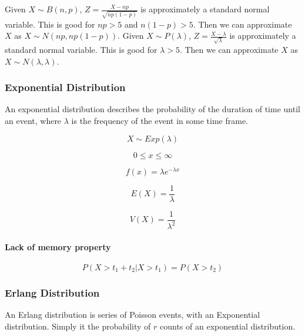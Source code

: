 \documentclass[12pt]{article}
\begin{document}
	Given \(X\sim B(n,p)\), \(Z=\frac{X-np}{\sqrt{np(1-p)}}\) is approximately a standard normal variable. This is good for \(np>5\) and \(n(1-p)>5\). Then we can approximate \(X\) as \(X\sim N(np, np(1-p))\).
	\newline
	\noindent Given \(X\sim P(\lambda)\), \(Z=\frac{X-\lambda}{\sqrt{\lambda}}\) is approximately a standard normal variable. This is good for \(\lambda>5\). Then we can approximate \(X\) as \(X\sim N(\lambda, \lambda)\).
	
	\newpage
	\subsubsection{Exponential Distribution}
	
	An exponential distribution describes the probability of the duration of time until an event, where \(\lambda\) is the frequency of the event in some time frame.
	
		\begin{equation*}
		X\sim Exp(\lambda)
		\end{equation*}
		
		\begin{equation*}
		0\leq x\leq \infty
		\end{equation*}
		
		\begin{equation*}
		f(x)=\lambda e^{-\lambda x}
		\end{equation*}
		
		\begin{equation*}
		E(X)=\frac{1}{\lambda}
		\end{equation*}
		
		\begin{equation*}
		V(X)=\frac{1}{\lambda ^2}
		\end{equation*}
	
	\paragraph{Lack of memory property}
	
	\begin{equation*}
		P(X>t_1+t_2|X>t_1)=P(X>t_2)
	\end{equation*}
	
	\subsubsection{Erlang Distribution}
	
	An Erlang distribution is series of Poisson events, with an Exponential distribution. Simply it the probability of \(r\) counts of an exponential distribution.	
\end{document}
